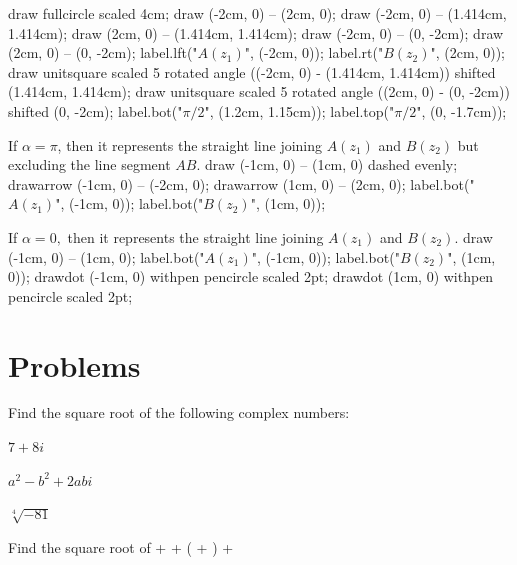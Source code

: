    \startplacefigure
      \startMPcode
        draw fullcircle scaled 4cm;
        draw (-2cm, 0) -- (2cm, 0);
        draw (-2cm, 0) -- (1.414cm, 1.414cm);
        draw (2cm, 0) -- (1.414cm, 1.414cm);
        draw (-2cm, 0) -- (0, -2cm);
        draw (2cm, 0) -- (0, -2cm);
        label.lft("$A(z_1)$", (-2cm, 0));
        label.rt("$B(z_2)$", (2cm, 0));
        draw unitsquare scaled 5 rotated angle ((-2cm, 0) - (1.414cm, 1.414cm)) shifted (1.414cm, 1.414cm);
        draw unitsquare scaled 5 rotated angle ((2cm, 0) - (0, -2cm)) shifted (0, -2cm);
        label.bot("$\pi/2$", (1.2cm, 1.15cm));
        label.top("$\pi/2$", (0, -1.7cm));
      \stopMPcode
    \stopplacefigure
  \item If $\alpha = \pi$, then it represents the straight line joining $A(z_1)$ and $B(z_2)$ but excluding the line segment $AB$.
    \startplacefigure
      \startMPcode
        draw (-1cm, 0) -- (1cm, 0) dashed evenly;
        drawarrow (-1cm, 0) -- (-2cm, 0);
        drawarrow (1cm, 0) -- (2cm, 0);
        label.bot("$A(z_1)$", (-1cm, 0));
        label.bot("$B(z_2)$", (1cm, 0));
      \stopMPcode
    \stopplacefigure
  \item If $\alpha = 0,$ then it represents the straight line joining $A(z_1)$ and $B(z_2)$.
    \startplacefigure
      \startMPcode
        draw (-1cm, 0) -- (1cm, 0);
        label.bot("$A(z_1)$", (-1cm, 0));
        label.bot("$B(z_2)$", (1cm, 0));
        drawdot (-1cm, 0) withpen pencircle scaled 2pt;
        drawdot (1cm, 0) withpen pencircle scaled 2pt;
      \stopMPcode
    \stopplacefigure
  \stopitemize
\stopitemize

\section{Problems}
Find the square root of the following complex numbers:


\startitemize[n, 1*broad]
\item $7 + 8i$
\item $a^2 - b^2 + 2abi$
\item $\sqrt[4]{-81}$
\item Find the square root of \startformula {} +  + \left( + \right) +
  \stopformula

